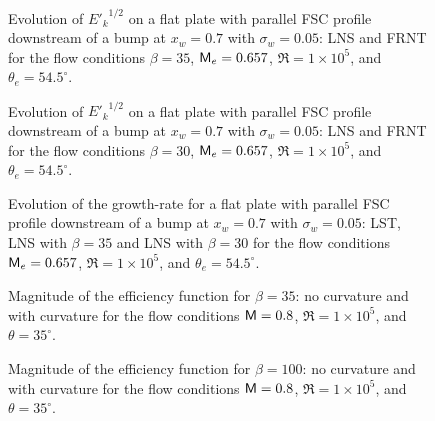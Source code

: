 %
%
\begin{figure}[p]
\centering
{}
\epsfxsize=5.4in 
\caption[Evolution of ${E'_k}^{1/2}$ on a flat plate with parallel FSC
profile] {Evolution of ${E'_k}^{1/2}$ on a flat plate with parallel FSC
profile downstream of a bump at $x_w=0.7$ with $\sigma_w=0.05$: \solid LNS and
\dashed FRNT for the flow conditions $\beta=35$, ${\sf M}_e=0.657$, $\Re=1\times
10^5$, and $\theta_e=54.5^\circ$.
\label{f:FSC-35} }
\end{figure}
%
\begin{figure}[p]
\centering
{}
\epsfxsize=5.4in 
\caption[Evolution of ${E'_k}^{1/2}$ on a flat plate with parallel FSC
profile] {Evolution of ${E'_k}^{1/2}$ on a flat plate with parallel FSC
profile downstream of a bump at $x_w=0.7$ with $\sigma_w=0.05$: \solid LNS and
\dashed FRNT for the flow conditions $\beta=30$, ${\sf M}_e=0.657$, $\Re=1\times
10^5$, and $\theta_e=54.5^\circ$.
\label{f:FSC-30} }
\end{figure}
%
\begin{figure}[p]
\centering
{}
\setvlabel{$\sigma$}
\epsfxsize=5.4in 
\caption[Evolution of the growth-rate for a flat plate with parallel FSC
profile] {Evolution of the growth-rate for a flat plate with parallel FSC
profile downstream of a bump at $x_w=0.7$ with $\sigma_w=0.05$: \solid LST,
\dashed LNS with $\beta=35$ and \dotted LNS with $\beta=30$ for the flow
conditions ${\sf M}_e=0.657$, $\Re=1\times 10^5$, and $\theta_e=54.5^\circ$.
\label{f:59} }
\end{figure}
%
%
\begin{figure}[p]
\centering
{}
\setvlabel{$|\Lambda|$}
\epsfxsize=5.4in 
\caption[Magnitude of the receptivity efficiency function for $\beta=35$]
{Magnitude of the efficiency function for $\beta=35$: \solid no curvature and
\dashed with curvature for the flow conditions ${\sf M}=0.8$, $\Re=1\times 10^5$,
and $\theta=35^\circ$.
\label{f:Lambda35} }
\end{figure}
%
\begin{figure}[p]
\centering
{}
\setvlabel{$|\Lambda|$}
\epsfxsize=5.4in 
\caption[Magnitude of the receptivity efficiency function for $\beta=100$]
{Magnitude of the efficiency function for $\beta=100$: \solid no curvature and
\dashed with curvature for the flow conditions ${\sf M}=0.8$, $\Re=1\times 10^5$,
and $\theta=35^\circ$.
\label{f:Lambda100} }
\end{figure}
